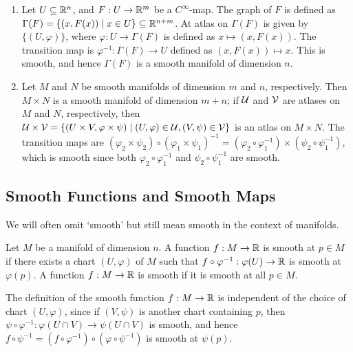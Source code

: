 \begin{example}
    \begin{enumerate}
        \item Let $U \subseteq \mathbb{R}^{n}$, and $F:U \to \mathbb{R}^{m}$ be a $C^{\infty}$-map. The graph of $F$ is defined as $\Gamma(F) = \{(x,F(x)) \mid x \in U\} \subseteq \mathbb{R}^{n+m}$. At atlas on $\Gamma(F)$ is given by $\{(U,\varphi)\}$, where $\varphi:U \to \Gamma(F)$ is defined as $x \mapsto (x,F(x))$. The transition map is $\varphi^{-1}:\Gamma(F) \to U$ defined as $(x,F(x)) \mapsto x$. This is smooth, and hence $\Gamma(F)$ is a smooth manifold of dimension $n$.
        \item Let $M$ and $N$ be smooth manifolds of dimension $m$ and $n$, respectively. Then $M \times N$ is a smooth manifold of dimension $m+n$; if $\mathcal{U}$ and $\mathcal{V}$ are atlases on $M$ and $N$, respectively, then $\mathcal{U} \times \mathcal{V} = \{(U \times V,\varphi \times \psi) \mid (U,\varphi) \in \mathcal{U}, (V,\psi) \in \mathcal{V}\}$ is an atlas on $M \times N$. The transition maps are $(\varphi_{2} \times \psi_{2}) \circ (\varphi_{1} \times \psi_{1})^{-1} = (\varphi_{2} \circ \varphi_{1}^{-1}) \times (\psi_{2} \circ \psi_{1}^{-1})$, which is smooth since both $\varphi_{2} \circ \varphi_{1}^{-1}$ and $\psi_{2} \circ \psi_{1}^{-1}$ are smooth.
    \end{enumerate}
\end{example}



\subsection{Smooth Functions and Smooth Maps}

We will often omit `smooth' but still mean smooth in the context of manifolds.
\begin{definition}
    Let $M$ be a manifold of dimension $n$. A function $f:M \to \mathbb{R}$ is smooth at $p \in M$ if there exists a chart $(U,\varphi)$ of $M$ such that $f \circ \varphi^{-1}:\varphi(U) \to \mathbb{R}$ is smooth at $\varphi(p)$. A function $f:M \to \mathbb{R}$ is smooth if it is smooth at all $p \in M$.
\end{definition}
The definition of the smooth function $f:M \to \mathbb{R}$ is independent of the choice of chart $(U,\varphi)$, since if $(V,\psi)$ is another chart containing $p$, then $\psi \circ \varphi^{-1}:\varphi(U \cap V) \to \psi(U \cap V)$ is smooth, and hence $f \circ \psi^{-1} = (f \circ \varphi^{-1}) \circ (\varphi \circ \psi^{-1})$ is smooth at $\psi(p)$.

